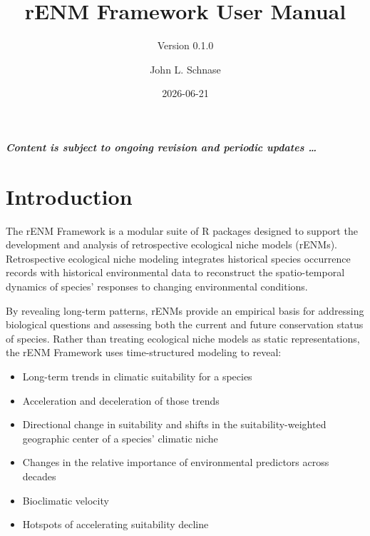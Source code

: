 \documentclass[
  letterpaper,
  DIV=11,
  numbers=noendperiod]{scrartcl}
\title{rENM Framework User Manual}
\subtitle{Version 0.1.0}
\author{John L. Schnase}
\date{2026-06-21}
\providecommand{\tightlist}{%
  \setlength{\itemsep}{0pt}\setlength{\parskip}{0pt}}
\renewcommand*\contentsname{Table of contents}
\newcommand\contentsname{Table of contents}
\begin{document}
\maketitle

\renewcommand*\contentsname{Table of contents}
{
\setcounter{tocdepth}{3}
\tableofcontents
}

\newpage{}

\begin{tcolorbox}[enhanced jigsaw, arc=.35mm, bottomrule=.15mm, breakable, colback=white, colframe=quarto-callout-caution-color-frame, left=2mm, leftrule=.75mm, opacityback=0, rightrule=.15mm, toprule=.15mm]

\textbf{\emph{Content is subject to ongoing revision and periodic
updates \ldots{}}}

\end{tcolorbox}

\section{Introduction}\label{introduction}

The rENM Framework is a modular suite of R packages designed to support
the development and analysis of retrospective ecological niche models
(rENMs). Retrospective ecological niche modeling integrates historical
species occurrence records with historical environmental data to
reconstruct the spatio-temporal dynamics of species' responses to
changing environmental conditions.

By revealing long-term patterns, rENMs provide an empirical basis for
addressing biological questions and assessing both the current and
future conservation status of species. Rather than treating ecological
niche models as static representations, the rENM Framework uses
time-structured modeling to reveal:

\begin{itemize}
\tightlist
\item
  Long-term trends in climatic suitability for a species
\item
  Acceleration and deceleration of those trends
\item
  Directional change in suitability and shifts in the
  suitability-weighted geographic center of a species' climatic niche
\item
  Changes in the relative importance of environmental predictors across
  decades
\item
  Bioclimatic velocity
\item
  Hotspots of accelerating suitability decline
\end{itemize}
\end{document}
